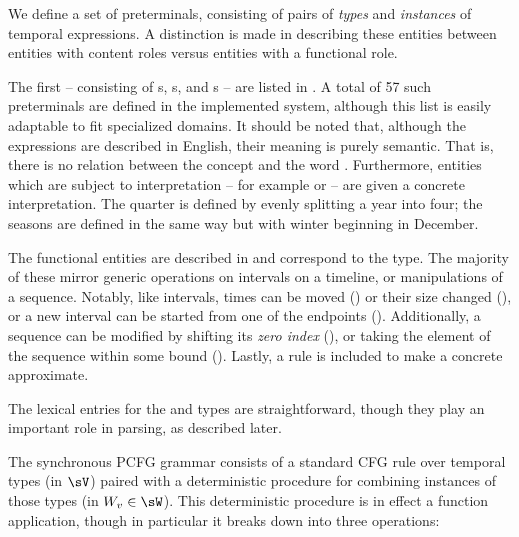 We define a set of preterminals, consisting of pairs of 
	\textit{types} and \textit{instances}	of temporal expressions.
A distinction is made in describing these entities between entities with 
	content roles versus entities with a functional role.

The first -- consisting of s, s, and s --
	are listed in .
A total of 57 such preterminals are defined in the implemented system,
	although this list is easily adaptable to fit specialized domains.
It should be noted that, although the expressions are described in English,
	their meaning is purely semantic.
That is, there is no relation between the concept  and the
	word .
Furthermore, entities which are subject to interpretation -- for example
	 or  -- are given a concrete interpretation.
The  quarter is defined by evenly splitting a year into four;
	the seasons are defined in the same way but with winter beginning in December.

The functional entities are described in  and correspond to
	the  type.
The majority of these mirror generic operations on intervals on a timeline,
	or manipulations of a sequence.
Notably, like intervals, times can be moved () or
	their size changed (), or
	a new interval can be started from one of the endpoints
	().
Additionally, a sequence can be modified by shifting its \textit{zero index}
	(), 
	or taking the  element of the sequence within some bound
	().
Lastly, a rule is included to make a concrete  approximate.

The lexical entries for the  and  types are straightforward,
	though they play an important role in parsing, as described later.


The synchronous PCFG grammar consists of a standard CFG rule over temporal
	types (in $\sV$) paired with a deterministic procedure for combining instances
	of those types (in $W_v \in \sW$).
This deterministic procedure is in effect a function application,
	though in particular it breaks down into three operations:

